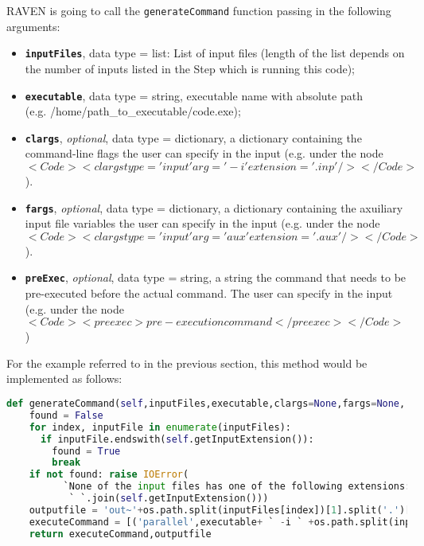RAVEN is going to call the \texttt{generateCommand} function passing in the following arguments:
\begin{itemize}
  \item \textbf{\texttt{inputFiles}}, data type = list: List of input files (length of the list depends on the
           number of inputs listed in the Step which is running this code);
  \item \textbf{\texttt{executable}}, data type = string, executable name with absolute
            path \\(e.g. /home/path\_to\_executable/code.exe);
  \item  \textbf{\texttt{clargs}}, \emph{optional}, data type = dictionary, a dictionary containing the command-line flags the
               user can specify in the input (e.g. under the node $<Code><clargs type='input' arg='-i' extension='.inp'/></Code>$).
  \item  \textbf{\texttt{fargs}}, \emph{optional}, data type = dictionary, a dictionary containing the axuiliary input file variables the
               user can specify in the input (e.g. under the node $<Code><clargs type='input' arg='aux' extension='.aux'/></Code>$).
             \item \textbf{\texttt{preExec}}, \emph{optional}, data type = string, a string the command that needs to be
               pre-executed before the actual command. The user can specify in the input
               (e.g. under the node $<Code><preexec>pre-execution command</preexec></Code>$)
\end{itemize}
For the example referred to in the previous section, this method would be implemented as follows:
\newline
\begin{lstlisting}[language=python]
  def generateCommand(self,inputFiles,executable,clargs=None,fargs=None, preExec=None):
    found = False
    for index, inputFile in enumerate(inputFiles):
      if inputFile.endswith(self.getInputExtension()):
        found = True
        break
    if not found: raise IOError(
          `None of the input files has one of the following extensions: ` +
           ` `.join(self.getInputExtension()))
    outputfile = 'out~'+os.path.split(inputFiles[index])[1].split('.')[0]
    executeCommand = [('parallel',executable+ ` -i ` +os.path.split(inputFiles[index])[1])]
    return executeCommand,outputfile
\end{lstlisting}


